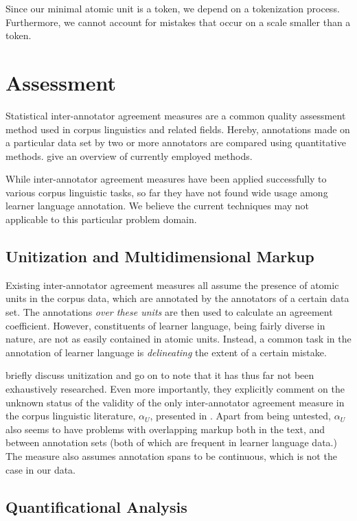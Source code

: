 \documentclass[12pt]{article}
\begin{document}
Since our minimal atomic unit is a token, we depend on a tokenization process.
Furthermore, we cannot account for mistakes that occur on a scale smaller than a
token.

\section{Assessment}\label{sec:results}

Statistical inter-annotator agreement  measures are a common quality assessment
method used in corpus linguistics and related fields. Hereby, annotations made
on a particular data set by two or more annotators are compared using
quantitative methods.  \cite{artstein} give an overview of currently employed
methods.

While inter-annotator agreement measures have been applied successfully to
various corpus linguistic tasks, so far they have not found wide usage among
learner language annotation. We believe the current techniques  may not
applicable to this particular problem domain.

\subsection{Unitization and Multidimensional Markup}

Existing inter-annotator agreement measures all assume the presence of atomic
units in the corpus data, which are annotated by the annotators of a certain
data set.  The annotations \textit{over these units} are then used to calculate an
agreement coefficient. However, constituents of learner language, being fairly
diverse in nature, are not as easily contained in atomic units. Instead, a
common task in the annotation of learner language is \textit{delineating}
the extent of a certain mistake.

\cite{artstein} briefly discuss unitization and go on to note that it has thus far
not been exhaustively researched. Even more importantly, they explicitly comment
on the unknown status of the validity of the only inter-annotator agreement
measure in the corpus linguistic literature, $\alpha_U$, presented in
\cite{krip}.  Apart from being untested, $\alpha_U$ also seems to have
problems with overlapping markup both in the text, and between annotation sets
(both of which are frequent in learner language data.) The measure also assumes
annotation spans to be continuous, which is not the case in our data.

\subsection{Quantificational Analysis}
\end{document}
